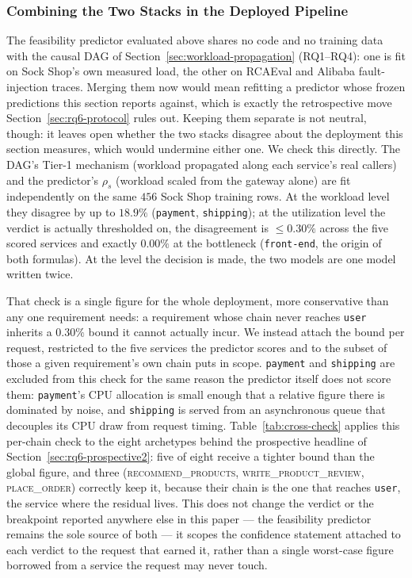 \documentclass[journal, 10pt]{IEEEtran}
\begin{document}
\subsubsection{Combining the Two Stacks in the Deployed Pipeline}
\label{sec:combine-ab}
The feasibility predictor evaluated above shares no code and no training data
with the causal DAG of Section~\ref{sec:workload-propagation} (RQ1--RQ4): one
is fit on Sock Shop's own measured load, the other on RCAEval and Alibaba
fault-injection traces. Merging them now would mean refitting a predictor
whose frozen predictions this section reports against, which is exactly the
retrospective move Section~\ref{sec:rq6-protocol} rules out. Keeping them
separate is not neutral, though: it leaves open whether the two stacks
disagree about the deployment this section measures, which would undermine
either one. We check this directly. The DAG's Tier-1 mechanism (workload
propagated along each service's real callers) and the predictor's $\rho_s$
(workload scaled from the gateway alone) are fit independently on the same
$456$ Sock Shop training rows. At the workload level they disagree by up to
$18.9\%$ (\texttt{payment}, \texttt{shipping}); at the utilization level the
verdict is actually thresholded on, the disagreement is $\leq 0.30\%$ across
the five scored services and exactly $0.00\%$ at the bottleneck
(\texttt{front-end}, the origin of both formulas). At the level the decision
is made, the two models are one model written twice.

That check is a single figure for the whole deployment, more conservative
than any one requirement needs: a requirement whose chain never reaches
\texttt{user} inherits a $0.30\%$ bound it cannot actually incur. We instead
attach the bound per request, restricted to the five services the predictor
scores and to the subset of those a given requirement's own chain puts in
scope. \texttt{payment} and \texttt{shipping} are excluded from this check for
the same reason the predictor itself does not score them: \texttt{payment}'s
CPU allocation is small enough that a relative figure there is dominated by
noise, and \texttt{shipping} is served from an asynchronous queue that
decouples its CPU draw from request timing. Table~\ref{tab:cross-check}
applies this per-chain check to the eight archetypes behind the prospective
headline of Section~\ref{sec:rq6-prospective2}: five of eight receive a
tighter bound than the global figure, and three
(\textsc{recommend\_products}, \textsc{write\_product\_review},
\textsc{place\_order}) correctly keep it, because their chain is the one that
reaches \texttt{user}, the service where the residual lives. This does not
change the verdict or the breakpoint reported anywhere else in this paper ---
the feasibility predictor remains the sole source of both --- it scopes the
confidence statement attached to each verdict to the request that earned it,
rather than a single worst-case figure borrowed from a service the request may
never touch.
\end{document}
